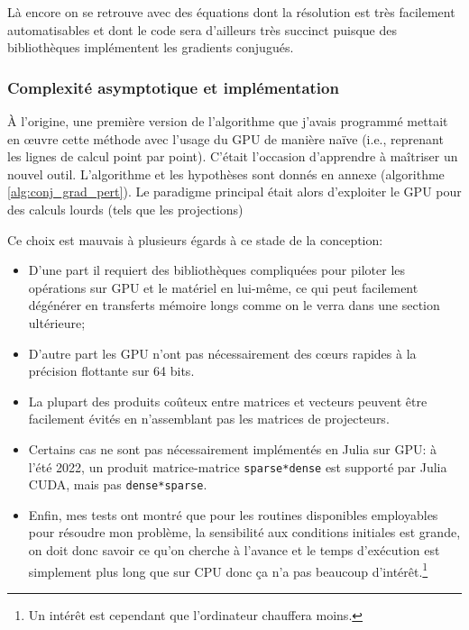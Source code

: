 \documentclass[svgnames,dvipsnames,a4paper,10pt,french]{report}
\begin{document}
Là encore on se retrouve avec des équations dont la résolution est très facilement automatisables et dont le code sera d'ailleurs très succinct puisque des bibliothèques implémentent les gradients conjugués.




\subsubsection{Complexité asymptotique et implémentation}

À l'origine, une première version de l'algorithme que j'avais programmé mettait en \oe{}uvre cette méthode avec l'usage du GPU de manière naïve (i.e., reprenant les lignes de calcul point par point). C'était l'occasion d'apprendre à maîtriser un nouvel outil. L'algorithme et les hypothèses sont donnés en annexe (algorithme \ref{alg:conj_grad_pert}). Le paradigme principal était alors d'exploiter le GPU pour des calculs lourds (tels que les projections)




    
    Ce choix est mauvais à plusieurs égards à ce stade de la conception:
\begin{itemize}
    \item D'une part il requiert des bibliothèques \og compliquées \fg{} pour piloter les opérations sur GPU et le matériel en lui-même, ce qui peut facilement dégénérer en transferts mémoire longs comme on le verra dans une section ultérieure;
    \item D'autre part les GPU n'ont pas nécessairement des c\oe{}urs rapides à la  précision flottante sur 64 bits.
    \item La plupart des produits coûteux entre matrices et vecteurs peuvent être facilement évités en n'assemblant pas les matrices de projecteurs. 
    \item Certains cas ne sont pas nécessairement implémentés en Julia sur GPU: à l'été 2022, un produit matrice-matrice \texttt{sparse*dense} est supporté par Julia CUDA, mais pas \texttt{dense*sparse}.
    \item Enfin, mes tests ont montré que pour les routines disponibles employables pour résoudre mon problème, la sensibilité aux conditions initiales est grande, on doit donc savoir ce qu'on cherche à l'avance et le temps d'exécution est simplement plus long que sur CPU donc ça n'a pas beaucoup d'intérêt.\footnote{Un intérêt est cependant que l'ordinateur chauffera moins.}
\end{itemize}
\end{document}
